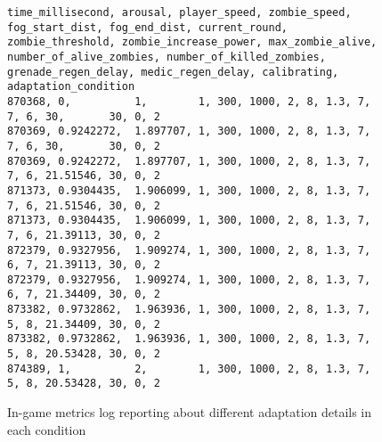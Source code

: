 \begin{figure}
  \centering
\begin{lstlisting}[frame=none]
time_millisecond, arousal, player_speed, zombie_speed, fog_start_dist, fog_end_dist, current_round, zombie_threshold, zombie_increase_power, max_zombie_alive, number_of_alive_zombies, number_of_killed_zombies, grenade_regen_delay, medic_regen_delay, calibrating, adaptation_condition
870368, 0,          1,        1, 300, 1000, 2, 8, 1.3, 7, 7, 6, 30,       30, 0, 2
870369, 0.9242272,  1.897707, 1, 300, 1000, 2, 8, 1.3, 7, 7, 6, 30,       30, 0, 2
870369, 0.9242272,  1.897707, 1, 300, 1000, 2, 8, 1.3, 7, 7, 6, 21.51546, 30, 0, 2
871373, 0.9304435,  1.906099, 1, 300, 1000, 2, 8, 1.3, 7, 7, 6, 21.51546, 30, 0, 2
871373, 0.9304435,  1.906099, 1, 300, 1000, 2, 8, 1.3, 7, 7, 6, 21.39113, 30, 0, 2
872379, 0.9327956,  1.909274, 1, 300, 1000, 2, 8, 1.3, 7, 6, 7, 21.39113, 30, 0, 2
872379, 0.9327956,  1.909274, 1, 300, 1000, 2, 8, 1.3, 7, 6, 7, 21.34409, 30, 0, 2
873382, 0.9732862,  1.963936, 1, 300, 1000, 2, 8, 1.3, 7, 5, 8, 21.34409, 30, 0, 2
873382, 0.9732862,  1.963936, 1, 300, 1000, 2, 8, 1.3, 7, 5, 8, 20.53428, 30, 0, 2
874389, 1,          2,        1, 300, 1000, 2, 8, 1.3, 7, 5, 8, 20.53428, 30, 0, 2
\end{lstlisting}
  \caption{In-game metrics log reporting about different adaptation details in each condition}
  \label{txt:log-metrics}
\end{figure}
